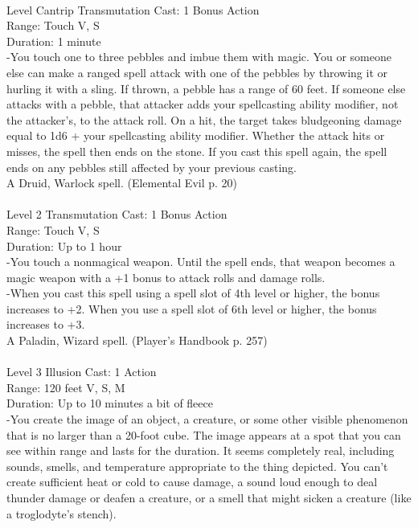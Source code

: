 \documentclass[10pt,twocolumn]{report}
\begin{document}
 \\
Level Cantrip \quad Transmutation \quad Cast: 1 Bonus Action\\
Range: Touch \quad V, S\\
Duration: 1 minute \quad \\
-You touch one to three pebbles and imbue them with magic. You or someone else can make a ranged spell attack with one of the pebbles by throwing it or hurling it with a sling. If thrown, a pebble has a range of 60 feet. If someone else attacks with a pebble, that attacker adds your spellcasting ability modifier, not the attacker’s, to the attack roll. On a hit, the target takes bludgeoning damage equal to 1d6 + your spellcasting ability modifier. Whether the attack hits or misses, the spell then ends on the stone.
If you cast this spell again, the spell ends on any pebbles still affected by your previous casting.\\
A Druid, Warlock spell. (Elemental Evil p. 20) \\


 \\
Level 2 \quad Transmutation \quad Cast: 1 Bonus Action\\
Range: Touch \quad V, S\\
Duration: Up to 1 hour \quad \\
-You touch a nonmagical weapon. Until the spell ends, that weapon becomes a magic weapon with a +1 bonus to attack rolls and damage rolls.\\
-When you cast this spell using a spell slot of 4th level or higher, the bonus increases to +2.
When you use a spell slot of 6th level or higher, the bonus increases to +3.\\
A Paladin, Wizard spell. (Player's Handbook p. 257) \\


 \\
Level 3 \quad Illusion \quad Cast: 1 Action\\
Range: 120 feet \quad V, S, M\\
Duration: Up to 10 minutes \quad a bit of fleece\\
-You create the image of an object, a creature, or some other visible phenomenon that is no larger than a 20-foot cube.
The image appears at a spot that you can see within range and lasts for the duration. It seems completely real, including sounds, smells, and temperature appropriate to the thing depicted. You can’t create sufficient heat or cold to cause damage, a sound loud enough to deal thunder damage or deafen a creature, or a smell that might sicken a creature (like a troglodyte’s stench).
\end{document}
